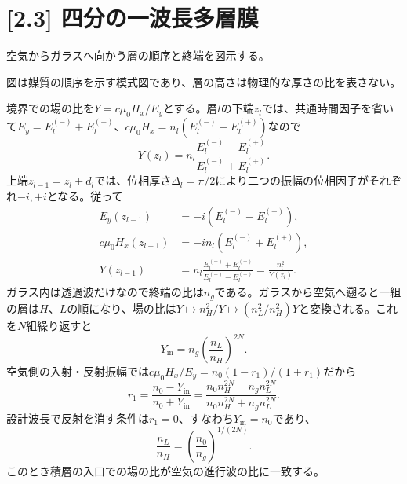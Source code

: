 \documentclass[11pt,a4paper]{article}
\begin{document}
\section*{[2.3] 四分の一波長多層膜}
空気からガラスへ向かう層の順序と終端を図示する。
\begin{center}
\par\small 図は媒質の順序を示す模式図であり、層の高さは物理的な厚さの比を表さない。
\end{center}
境界での場の比を$Y=c\mu_0H_x/E_y$とする。層$l$の下端$z_l$では、共通時間因子を省いて$E_y=E_l^{(-)}+E_l^{(+)}$、$c\mu_0H_x=n_l(E_l^{(-)}-E_l^{(+)})$なので
\begin{equation}
 Y(z_l)=n_l\frac{E_l^{(-)}-E_l^{(+)}}{E_l^{(-)}+E_l^{(+)}}.
\end{equation}
上端$z_{l-1}=z_l+d_l$では、位相厚さ$\Delta_l=\pi/2$により二つの振幅の位相因子がそれぞれ$-i,+i$となる。従って
\begin{align}
 E_y(z_{l-1})&=-i(E_l^{(-)}-E_l^{(+)}),\\
 c\mu_0H_x(z_{l-1})&=-in_l(E_l^{(-)}+E_l^{(+)}),\\
 Y(z_{l-1})&=n_l\frac{E_l^{(-)}+E_l^{(+)}}{E_l^{(-)}-E_l^{(+)}}
 =\frac{n_l^2}{Y(z_l)}.
\end{align}
ガラス内は透過波だけなので終端の比は$n_g$である。ガラスから空気へ遡ると一組の層は$H$、$L$の順になり、場の比は$Y\mapsto n_H^2/Y\mapsto(n_L^2/n_H^2)Y$と変換される。これを$N$組繰り返すと
\begin{equation}
 Y_{\mathrm{in}}=n_g\left(\frac{n_L}{n_H}\right)^{2N}.
\end{equation}
空気側の入射・反射振幅では$c\mu_0H_x/E_y=n_0(1-r_1)/(1+r_1)$だから
\begin{equation}
 \boxed{r_1=\frac{n_0-Y_{\mathrm{in}}}{n_0+Y_{\mathrm{in}}}
 =\frac{n_0n_H^{2N}-n_gn_L^{2N}}{n_0n_H^{2N}+n_gn_L^{2N}}}.
\end{equation}
設計波長で反射を消す条件は$r_1=0$、すなわち$Y_{\mathrm{in}}=n_0$であり、
\begin{equation}
 \boxed{\frac{n_L}{n_H}=\left(\frac{n_0}{n_g}\right)^{1/(2N)}}.
\end{equation}
このとき積層の入口での場の比が空気の進行波の比に一致する。
\end{document}
